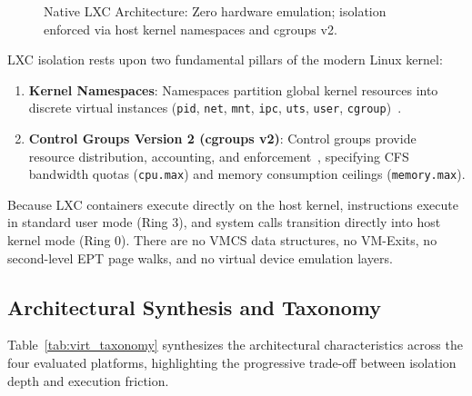 \begin{figure}[t]
\caption{Native LXC Architecture: Zero hardware emulation; isolation enforced via host kernel namespaces and cgroups v2.}
\label{fig:lxc_arch}
\end{figure}

LXC isolation rests upon two fundamental pillars of the modern Linux kernel:
\begin{enumerate}
    \item \textbf{Kernel Namespaces}: Namespaces partition global kernel resources into discrete virtual instances (\texttt{pid}, \texttt{net}, \texttt{mnt}, \texttt{ipc}, \texttt{uts}, \texttt{user}, \texttt{cgroup})~\cite{kerrisk2010linux}.
    \item \textbf{Control Groups Version 2 (cgroups v2)}: Control groups provide resource distribution, accounting, and enforcement~\cite{cgroupsv2kernel}, specifying CFS bandwidth quotas (\texttt{cpu.max}) and memory consumption ceilings (\texttt{memory.max}).
\end{enumerate}

Because LXC containers execute directly on the host kernel, instructions execute in standard user mode (Ring 3), and system calls transition directly into host kernel mode (Ring 0). There are no VMCS data structures, no VM-Exits, no second-level EPT page walks, and no virtual device emulation layers.

\subsection{Architectural Synthesis and Taxonomy}
\label{subsec:architectural_taxonomy}

Table~\ref{tab:virt_taxonomy} synthesizes the architectural characteristics across the four evaluated platforms, highlighting the progressive trade-off between isolation depth and execution friction.

